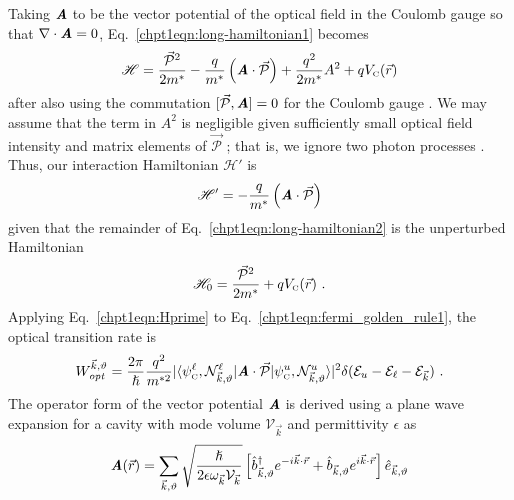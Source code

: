 {Taking $\textit{\textbf{A}}$ to be the vector potential of the optical field in the Coulomb gauge so that $\nabla\cdot \textit{\textbf{A}}=0$, Eq.~\eqref{chpt1eqn:long-hamiltonian1} becomes
\begin{equation}
\label{chpt1eqn:long-hamiltonian2}
\mathscr{H} = \frac{\vec{\mathcal{P}}^2}{2 m^*} -\frac{q}{m^*}\left(\textbf{\textit{A}} \cdot \vec{\mathcal{P}} \right) + \frac{q^2}{2 m^*} A^2 + q V_{\textnormal{\tiny{C}}}(\vec{r})
\end{equation}
after also using the commutation $[\vec{\mathcal{P}},\textit{\textbf{A}}]=0$ for the Coulomb gauge \cite{CohenTannoudji}.  We may assume that the term in $A^2$ is negligible given sufficiently small optical field intensity and matrix elements of $\vec{\mathcal{P}}$ \cite{Yariv:book:1989}; that is, we ignore two photon processes \cite{Parker:book:2005}.  Thus, our interaction Hamiltonian $\mathscr{H}'$ is
\begin{equation}
\label{chpt1eqn:Hprime}
\mathscr{H}'=-\frac{q}{m^*}\left(\textit{\textbf{A}} \cdot \vec{\mathcal{P}} \right)
\end{equation}
given that the remainder of Eq.~\eqref{chpt1eqn:long-hamiltonian2} is the unperturbed Hamiltonian
\begin{equation}
\mathscr{H}_0=\frac{\vec{\mathcal{P}}^2}{2 m^*} + q V_{\textnormal{\tiny{C}}}(\vec{r}) \textnormal{~.}
\end{equation}
Applying Eq.~\eqref{chpt1eqn:Hprime} to Eq.~\eqref{chpt1eqn:fermi_golden_rule1}, the optical transition rate is
\begin{equation}
\label{chpt1eqn:fermi_golden_rule2}
W_\textit{opt}^{\vec{k},\vartheta} = \frac{2 \pi}{\hslash} \frac{q^2}{m^{*2}} \vert\langle \psi_\tn{\tiny{C}}^\ell,\mathcal{N}^\ell_{\vec{k},\vartheta} \vert \textit{\textbf{A}} \cdot \vec{\mathcal{P}}
\vert \psi_\tn{\tiny{C}}^u,\mathcal{N}^u_{\vec{k},\vartheta}  \rangle\vert^2 \delta(\EE_u-\EE_\ell-\EE_{\vec{k}}) \tn{~.}
\end{equation}
The operator form of the vector potential $\textit{\textbf{A}}$ is derived using a plane wave expansion for a cavity with mode volume $\mathcal{V}_{\vec{k}}$ and permittivity $\epsilon$ as \cite{Parker:book:2005}
\begin{equation}
\textit{\textbf{A}}(\vec{r})=\sum_{\vec{k},\vartheta} \sqrt{\frac{\hslash}{2 \epsilon \omega_{\vec{k}} \mathcal{V}_{\vec{k}}}} \left[ \hat{b}^\dagger_{\vec{k},\vartheta} e^{-i \vec{k} \cdot \vec{r}} +  \hat{b}_{\vec{k},\vartheta} e^{i \vec{k} \cdot \vec{r}}\right]
\hat{e}_{\vec{k},\vartheta}
\end{equation}
}
